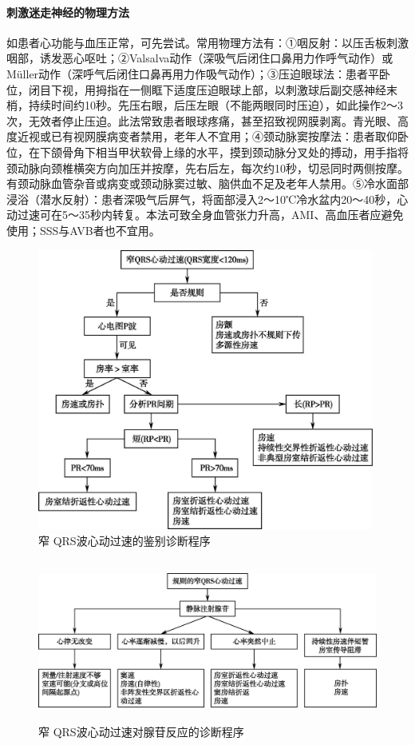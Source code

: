 \paragraph{刺激迷走神经的物理方法}

如患者心功能与血压正常，可先尝试。常用物理方法有：①咽反射：以压舌板刺激咽部，诱发恶心呕吐；②Valsalva动作（深吸气后闭住口鼻用力作呼气动作）或Müller动作（深呼气后闭住口鼻再用力作吸气动作）；③压迫眼球法：患者平卧位，闭目下视，用拇指在一侧眶下适度压迫眼球上部，以刺激球后副交感神经末梢，持续时间约10秒。先压右眼，后压左眼（不能两眼同时压迫），如此操作2～3次，无效者停止压迫。此法常致患者眼球疼痛，甚至招致视网膜剥离。青光眼、高度近视或已有视网膜病变者禁用，老年人不宜用；④颈动脉窦按摩法：患者取仰卧位，在下颌骨角下相当甲状软骨上缘的水平，摸到颈动脉分叉处的搏动，用手指将颈动脉向颈椎横突方向加压并按摩，先右后左，每次约10秒，切忌同时两侧按摩。有颈动脉血管杂音或病变或颈动脉窦过敏、脑供血不足及老年人禁用。⑤冷水面部浸浴（潜水反射）：患者深吸气后屏气，将面部浸入2～10℃冷水盆内20～40秒，心动过速可在5～35秒内转复。本法可致全身血管张力升高，AMI、高血压者应避免使用；SSS与AVB者也不宜用。

\begin{figure}[!htbp]
 \centering
 \includegraphics[width=4.36458in,height=3.64583in]{./images/Image00417.jpg}
 \captionsetup{justification=centering}
 \caption{窄 QRS波心动过速的鉴别诊断程序}
 \label{fig102-5}
  \end{figure} 

\begin{figure}[!htbp]
 \centering
 \includegraphics[width=5.27083in,height=2.09375in]{./images/Image00418.jpg}
 \captionsetup{justification=centering}
 \caption{窄 QRS波心动过速对腺苷反应的诊断程序}
 \label{fig102-6}
  \end{figure} 

